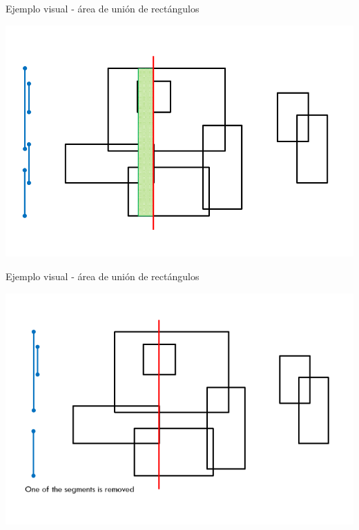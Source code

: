 \documentclass[compress]{beamer}
\begin{document}
\begin{frame}{Ejemplo visual - área de unión de rectángulos}
\begin{center}
\includegraphics[scale=0.4]{images/sweep_line_9.png}
\end{center}
\end{frame}

\begin{frame}{Ejemplo visual - área de unión de rectángulos}
\begin{center}
\includegraphics[scale=0.4]{images/sweep_line_10.png}
\end{center}
\end{frame}
\end{document}
